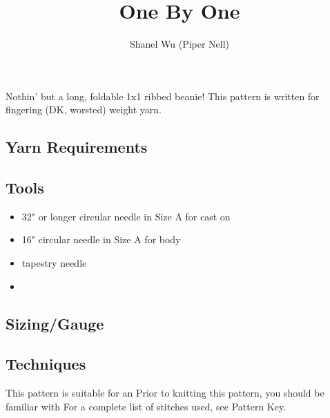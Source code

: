\documentclass[12pt]{article}
\title{One By One} %
\author{Shanel Wu (Piper Nell)}
\begin{document}
\begin{titlingpage}


{\selectfont
\HUGE\textbf{\thetitle}
\hspace{2em} %
\normalsize\theauthor
}

\begin{multicols}{2}

Nothin' but a long, foldable 1x1 ribbed beanie! This pattern is written for fingering (DK, worsted) weight yarn.

\subsection*{Yarn Requirements}



\subsection*{Tools}

\begin{itemize}
\item 32" or longer circular needle in Size A for cast on
\item 16" circular needle in Size A for body
\item tapestry needle
\item %
\end{itemize}

\subsection*{Sizing/Gauge}


\subsection*{Techniques}

This pattern is suitable for an %
Prior to knitting this pattern, you should be familiar with %
For a complete list of stitches used, see Pattern Key.


\end{multicols}
\end{titlingpage}
\end{document}

